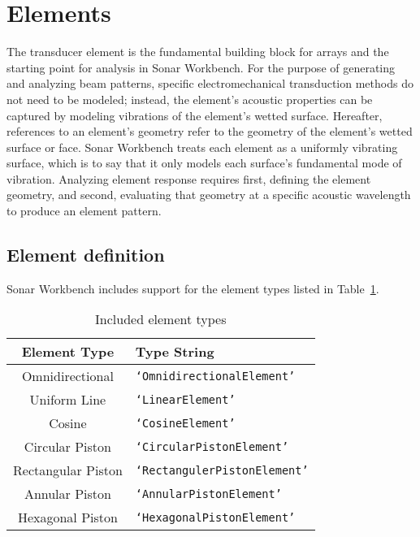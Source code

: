 \section{Elements}\label{sec:element}

The transducer element is the fundamental building block for arrays and the starting point for analysis in Sonar Workbench. For the purpose of generating and analyzing beam patterns, specific electromechanical transduction methods do not need to be modeled; instead, the element's acoustic properties can be captured by modeling vibrations of the element's wetted surface. Hereafter, references to an element's geometry refer to the geometry of the element's wetted surface or face. Sonar Workbench treats each element as a uniformly vibrating surface, which is to say that it only models each surface's fundamental mode of vibration. Analyzing element response requires first, defining the element geometry, and second, evaluating that geometry at a specific acoustic wavelength to produce an element pattern.

\subsection{Element definition}

Sonar Workbench includes support for the element types listed in Table~\ref{tab:ElementTypes}. 

\begin{table}[!ht]
	\begin{center}
		\caption{Included element types}
		\label{tab:ElementTypes}
		\begin{tabular}{c|l} 
			\textbf{Element Type} & \textbf{Type String} \\
			\hline
			Omnidirectional  & \texttt{`OmnidirectionalElement'} \\
			Uniform Line & \texttt{`LinearElement'} \\
			Cosine & \texttt{`CosineElement'} \\
			Circular Piston & \texttt{`CircularPistonElement'} \\
			Rectangular Piston & \texttt{`RectangulerPistonElement'} \\
			Annular Piston & \texttt{`AnnularPistonElement'} \\
			Hexagonal Piston & \texttt{`HexagonalPistonElement'} \\
		\end{tabular}
	\end{center}
\end{table}

